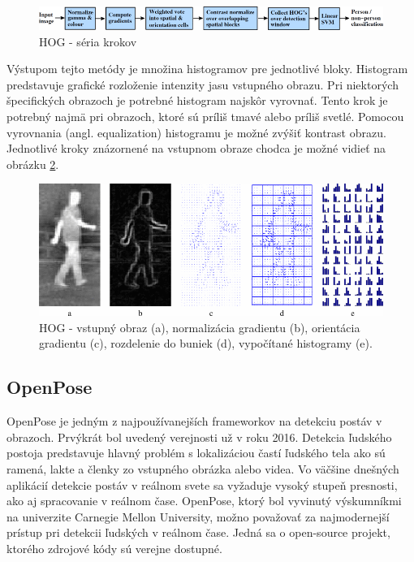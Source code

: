 \documentclass[slovak,master,dept460,male,cpp,cpdeclaration]{diploma}
\begin{document}
\begin{figure}[H]
	\centering
	\includegraphics[width=1\textwidth]{Figures/hog.png}
	\caption{HOG - séria krokov \cite{dalal2005}}
	\label{fig:HOG1}
\end{figure}

Výstupom tejto metódy je množina histogramov pre jednotlivé bloky. Histogram predstavuje grafické rozloženie intenzity jasu vstupného obrazu. Pri niektorých špecifických obrazoch je potrebné histogram najskôr vyrovnať. Tento krok je potrebný najmä pri obrazoch, ktoré sú príliš tmavé alebo príliš svetlé. Pomocou vyrovnania (angl. equalization) histogramu  je možné zvýšiť kontrast obrazu. Jednotlivé kroky znázornené na vstupnom obraze chodca je možné vidieť na obrázku \ref{fig:HOG2}.\par


\begin{figure}[H]
	\centering
	\includegraphics[width=1\textwidth]{Figures/hog3.png}
	\caption{HOG - vstupný obraz (a), normalizácia gradientu (b), orientácia gradientu (c), rozdelenie do buniek (d), vypočítané histogramy (e). \cite{bertozzi2007pedestrian}}
	\label{fig:HOG2}
\end{figure}


\newpage
\subsection{OpenPose}
OpenPose\cite{cao2018openpose} je jedným z najpoužívanejších frameworkov na detekciu postáv v obrazoch. Prvýkrát bol uvedený verejnosti už v roku 2016. Detekcia ľudského postoja predstavuje hlavný problém s lokalizáciou častí ľudského tela ako sú ramená, lakte a členky zo vstupného obrázka alebo videa. Vo väčšine dnešných aplikácií detekcie postáv v reálnom svete sa vyžaduje vysoký stupeň presnosti, ako aj spracovanie v reálnom čase.
OpenPose, ktorý bol vyvinutý výskumníkmi na univerzite Carnegie Mellon University, možno považovať za najmodernejší prístup pri detekcii ľudských v reálnom čase. Jedná sa o open-source projekt, ktorého zdrojové kódy sú verejne dostupné\cite{githubOpenpose}.
\end{document}
